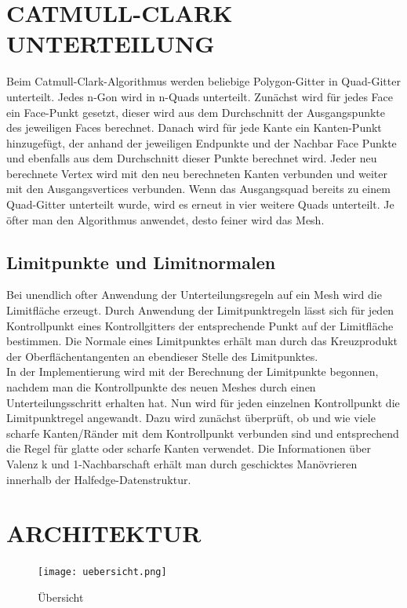\section{\Large CATMULL-CLARK UNTERTEILUNG}
Beim Catmull-Clark-Algorithmus werden beliebige Polygon-Gitter in Quad-Gitter unterteilt. Jedes n-Gon wird in n-Quads unterteilt. Zunächst wird für jedes Face ein Face-Punkt gesetzt, dieser wird aus dem Durchschnitt der Ausgangspunkte des jeweiligen Faces berechnet. Danach wird für jede Kante ein Kanten-Punkt hinzugefügt, der anhand der jeweiligen Endpunkte und der Nachbar Face Punkte und ebenfalls aus dem Durchschnitt dieser Punkte berechnet wird. Jeder neu berechnete Vertex wird mit den neu berechneten Kanten verbunden und weiter mit den Ausgangsvertices verbunden. Wenn das Ausgangsquad bereits zu einem Quad-Gitter unterteilt wurde, wird es erneut in vier weitere Quads unterteilt. Je öfter man den Algorithmus anwendet, desto feiner wird das Mesh.

\subsection{Limitpunkte und Limitnormalen}
Bei unendlich ofter Anwendung der Unterteilungsregeln auf ein Mesh wird die Limitfläche erzeugt. Durch Anwendung der Limitpunktregeln lässt sich für jeden Kontrollpunkt eines Kontrollgitters der entsprechende Punkt auf der Limitfläche bestimmen. Die Normale eines Limitpunktes erhält man durch das Kreuzprodukt der Oberflächentangenten an ebendieser Stelle des Limitpunktes.\\
In der Implementierung wird mit der Berechnung der Limitpunkte begonnen, nachdem man die Kontrollpunkte des neuen Meshes durch einen Unterteilungsschritt erhalten hat. Nun wird für jeden einzelnen Kontrollpunkt die Limitpunktregel angewandt. Dazu wird zunächst überprüft, ob und wie viele scharfe Kanten/Ränder mit dem Kontrollpunkt verbunden sind und entsprechend die Regel für glatte oder scharfe Kanten verwendet. Die Informationen über Valenz k und 1-Nachbarschaft erhält man durch geschicktes Manövrieren innerhalb der Halfedge-Datenstruktur.

\section{\Large ARCHITEKTUR}

\begin{figure}[H]
\centering
\texttt{[image: uebersicht.png]}
\caption{Übersicht}
\label{fig1}
\end{figure}

